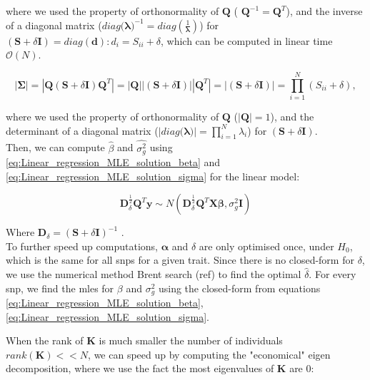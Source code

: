 where we used the property of orthonormality of $\mathbf{Q}$ ( $\mathbf{Q}^{-1} = \mathbf{Q}^T$), and the inverse of a diagonal matrix ($diag(\boldsymbol{\lambda)}^{-1} = diag(\frac{1}{\boldsymbol{\lambda}})$) for $(\mathbf{S} + \delta\mathbf{I}) = diag(\mathbf{d}): d_i = S_{ii} + \delta$, which can be computed in linear time $\mathcal{O}(N)$.

\begin{equation}\label{eq:fast_lmm_Sigma_determinant}
    |\boldsymbol{\Sigma}| = |\mathbf{Q} (\mathbf{S} + \delta\mathbf{I})\mathbf{Q}^T|= |\mathbf{Q}||(\mathbf{S} + \delta\mathbf{I})||\mathbf{Q}^T| = |(\mathbf{S} + \delta\mathbf{I})| =  \prod_{i=1}^{N} (S_{ii} + \delta),
\end{equation}

where we used the property of orthonormality of $\mathbf{Q}$ ($|\mathbf{Q}|=1$), and the determinant of a diagonal matrix ($|diag(\boldsymbol{\lambda)}| = \prod_{i=1}^{N} \lambda_i$) for $(\mathbf{S} + \delta\mathbf{I})$.\\

Then, we can compute $\hat{\beta}$ and  $\hat{\sigma_g^2}$ using \eqref{eq:Linear_regression_MLE_solution_beta} and \eqref{eq:Linear_regression_MLE_solution_sigma} for the linear model:

\begin{equation}
    \mathbf{D}^{\frac{1}{2}}_{\delta}\mathbf{Q}^{T}\mathbf{y} \sim N(\mathbf{D}^{\frac{1}{2}}_{\delta}\mathbf{Q}^{T}\mathbf{X}\boldsymbol{\beta}, \sigma_g^2\mathbf{I})
\end{equation}

Where $\mathbf{D}_{\delta} = (\mathbf{S} + \delta\mathbf{I})^{-1}$ .\\

To further speed up computations, $\boldsymbol{\alpha}$ and $\delta$ are only optimised once, under $H_0$, which is the same for all \gls{snp}s for a given trait.
Since there is no closed-form for $\delta$, we use the numerical method Brent search (ref) to find the optimal $\hat{\delta}$.
For every \gls{snp}, we find the \gls{mle}s for $\beta$ and $\sigma^2_g$ using the closed-form from equations \eqref{eq:Linear_regression_MLE_solution_beta}, \eqref{eq:Linear_regression_MLE_solution_sigma}.

When the rank of $\mathbf{K}$ is much smaller the number of individuals $rank(\mathbf{K}) << N$,  we can speed up by computing the "economical" eigen decomposition, where we use the fact the most eigenvalues of $\mathbf{K}$ are 0:

